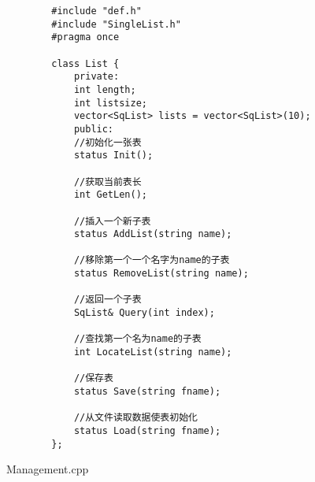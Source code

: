 \documentclass[supercite]{Experimental_Report}
\begin{document}
	\begin{lstlisting}
		#include "def.h"
		#include "SingleList.h"
		#pragma once
		
		class List {
			private:
			int length;
			int listsize;
			vector<SqList> lists = vector<SqList>(10);
			public:
			//初始化一张表
			status Init();
			
			//获取当前表长
			int GetLen();
			
			//插入一个新子表
			status AddList(string name);
			
			//移除第一个一个名字为name的子表
			status RemoveList(string name);
			
			//返回一个子表
			SqList& Query(int index);
			
			//查找第一个名为name的子表
			int LocateList(string name);
			
			//保存表
			status Save(string fname);
			
			//从文件读取数据使表初始化
			status Load(string fname);
		};
	\end{lstlisting}
	Management.cpp
\end{document}
